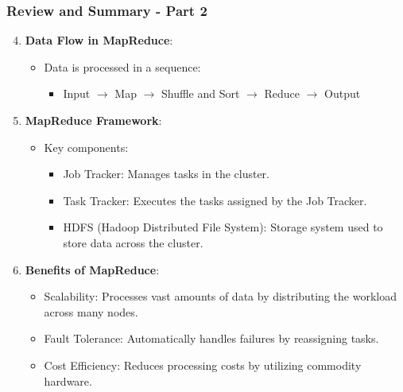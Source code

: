 \documentclass[aspectratio=169]{beamer}
\begin{document}
\begin{frame}[fragile]
    \frametitle{Review and Summary - Part 2}
    \begin{enumerate}
        \setcounter{enumii}{3}
        \item \textbf{Data Flow in MapReduce}:
        \begin{itemize}
            \item Data is processed in a sequence:
            \begin{itemize}
                \item Input $\rightarrow$ Map $\rightarrow$ Shuffle and Sort $\rightarrow$ Reduce $\rightarrow$ Output
            \end{itemize}
        \end{itemize}

        \item \textbf{MapReduce Framework}:
        \begin{itemize}
            \item Key components:
            \begin{itemize}
                \item Job Tracker: Manages tasks in the cluster.
                \item Task Tracker: Executes the tasks assigned by the Job Tracker.
                \item HDFS (Hadoop Distributed File System): Storage system used to store data across the cluster.
            \end{itemize}
        \end{itemize}
        
        \item \textbf{Benefits of MapReduce}:
        \begin{itemize}
            \item Scalability: Processes vast amounts of data by distributing the workload across many nodes.
            \item Fault Tolerance: Automatically handles failures by reassigning tasks.
            \item Cost Efficiency: Reduces processing costs by utilizing commodity hardware.
        \end{itemize}
    \end{enumerate}
\end{frame}
\end{document}
